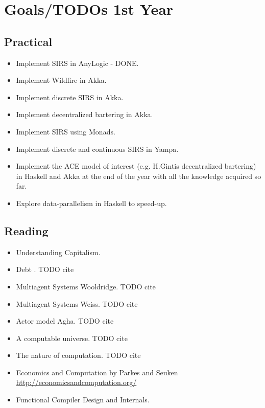 \documentclass{article}
\begin{document}
\pagebreak

\section{Goals/TODOs 1st Year}
\subsection{Practical}
\begin{itemize}
\item Implement SIRS in AnyLogic - DONE.
\item Implement Wildfire in Akka.
\item Implement discrete SIRS in Akka.
\item Implement decentralized bartering in Akka.
\item Implement SIRS using Monads.
\item Implement discrete and continuous SIRS in Yampa.
\item Implement the ACE model of interest (e.g. H.Gintis decentralized bartering) in Haskell and Akka at the end of the year with all the knowledge acquired so far.
\item Explore data-parallelism in Haskell to speed-up.
\end{itemize}

\subsection{Reading}
\begin{itemize}
\item Understanding Capitalism. \cite{bowles_understanding_2005}
\item Debt . TODO cite
\item Multiagent Systems Wooldridge. TODO cite
\item Multiagent Systems Weiss. TODO cite
\item Actor model Agha. TODO cite
\item A computable universe. TODO cite
\item The nature of computation. TODO cite
\item Economics and Computation by Parkes and Seuken \url{http://economicsandcomputation.org/}
\item Functional Compiler Design and Internals.
\end{itemize}
\end{document}
